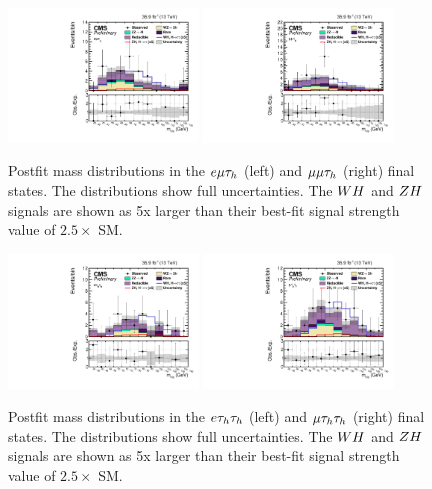 \begin{figure}[h!]
 \begin{center}
  \includegraphics[width=0.45\textwidth]{higgs_to_taus_vh/plots/wh/emt_postfit.pdf}
  \includegraphics[width=0.45\textwidth]{higgs_to_taus_vh/plots/wh/mmt_postfit.pdf}
 \end{center}
 \caption{Postfit mass distributions in the $e\mu\tau_{h}$ (left) and 
 $\mu\mu\tau_{h}$ (right) final states.
 The distributions show full uncertainties.
 The $WH$ and $ZH$ signals are shown as 5x larger than their best-fit
 signal strength value of $2.5 \times$ SM.
 }
 \label{fig:mass_llt}
\end{figure}

\begin{figure}[h!]
 \begin{center}
  \includegraphics[width=0.45\textwidth]{higgs_to_taus_vh/plots/wh/ett_postfit.pdf}
  \includegraphics[width=0.45\textwidth]{higgs_to_taus_vh/plots/wh/mtt_postfit.pdf}
 \end{center}
 \caption{Postfit mass distributions in the $e\tau_{h}\tau_{h}$ (left) 
 and $\mu\tau_{h}\tau_{h}$ (right) final states.
 The distributions show full uncertainties.
 The $WH$ and $ZH$ signals are shown as 5x larger than their best-fit
 signal strength value of $2.5 \times$ SM.
 }
 \label{fig:mass_ltt}
\end{figure}

